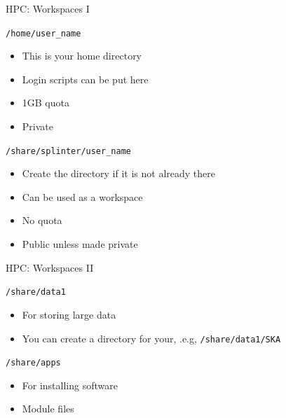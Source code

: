 \documentclass{beamer}
\begin{document}


\begin{frame}{HPC: Workspaces I}
	\begin{block}{\texttt{/home/user\_name}}
		\begin{itemize}
			\item This is your home directory
			\item Login scripts can be put here
			\item 1GB quota
			\item Private
		\end{itemize}
	\end{block}
	\begin{block}{\texttt{/share/splinter/user\_name}}
		\begin{itemize}
			\item Create the directory if it is not already there
			\item Can be used as a workspace
			\item No quota
			\item Public unless made private
		\end{itemize}
	\end{block}
\end{frame}

\begin{frame}{HPC: Workspaces II}
	\begin{block}{\texttt{/share/data1}}
		\begin{itemize}
			\item For storing large data
			\item You can create a directory for your, .e.g, \texttt{/share/data1/SKA}
		\end{itemize}
	\end{block}

	\begin{block}{\texttt{/share/apps}}
		\begin{itemize}
			\item For installing software
			\item Module files
		\end{itemize}
	\end{block}
\end{frame}
\end{document}
